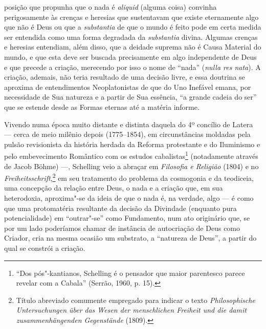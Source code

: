 posição que propunha que o nada é \emph{aliquid} (alguma
coisa) convinha perigosamente às crenças e heresias que
sustentavam que existe eternamente algo que não é Deus ou que a
\emph{substantia} de que o mundo é feito pode em certa medida
ser entendida como uma forma degradada da \emph{substantia}
divina. Algumas crenças e heresias entendiam, além disso, que a
deidade suprema não é Causa Material do mundo, e que esta deve
ser buscada precisamente em algo independente de Deus e que
precede a criação, merecendo por isso o nome de “nada”
(\emph{nulla res nata}). A criação, ademais, não teria
resultado de uma decisão livre, e essa doutrina se aproxima de
entendimentos Neoplatonistas de que do Uno Inefável emana, por
necessidade de Sua natureza e a partir de Sua essência, “a
grande cadeia do ser” que se estende desde as Formas eternas até
a matéria informe.

Vivendo numa época muito distante e distinta daquela do 4º
concílio de Latera --- cerca de meio milênio depois (1775--1854),
em circunstâncias moldadas pela pulsão revisionista da história
herdada da Reforma protestante e do Iluminismo e pelo
embevecimento Romântico com os estudos cabalistas\footnote{ “Dos
pós"-kantianos, Schelling é o pensador que maior parentesco
parece revelar com a Cabala” (Serrão, 1960, p. 15).}
(notadamente através de Jacob Böhme) ---, Schelling veio a abraçar
em \emph{Filosofia e Religião} (1804) e no
\emph{Freiheitsschrift},\footnote{ Título abreviado comumente
empregado para indicar o texto \emph{Philosophische
Untersuchungen über} \emph{das Wesen der menschlichen Freiheit
und die damit zusammenhängenden Gegenstände} (1809).} em seu
tratamento do problema da cosmogonia e da teodiceia, uma
concepção da relação entre Deus, o nada e a criação que, em sua
heterodoxia, aproxima"-se da ideia de que o nada é, na verdade,
algo --- é como que uma protomatéria resultante da decisão da
Divindade (enquanto pura potencialidade) em “outrar"-se” como
Fundamento, num ato originário que, se por um lado poderíamos
chamar de instância de autocriação de Deus como Criador, cria na
mesma ocasião um substrato, a “natureza de Deus”, a partir do
qual se constrói a criação. 

